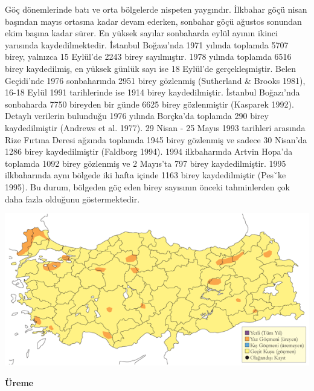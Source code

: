 \documentclass[
  letterpaper,
  DIV=11,
  numbers=noendperiod]{scrreprt}
\begin{document}
Göç dönemlerinde batı ve orta bölgelerde nispeten yaygındır. İlkbahar
göçü nisan başından mayıs ortasına kadar devam ederken, sonbahar göçü
ağustos sonundan ekim başına kadar sürer. En yüksek sayılar sonbaharda
eylül ayının ikinci yarısında kaydedilmektedir. İstanbul Boğazı'nda 1971
yılında toplamda 5707 birey, yalnızca 15 Eylül'de 2243 birey
sayılmıştır. 1978 yılında toplamda 6516 birey kaydedilmiş, en yüksek
günlük sayı ise 18 Eylül'de gerçekleşmiştir. Belen Geçidi'nde 1976
sonbaharında 2951 birey gözlenmiş (Sutherland \& Brooks 1981), 16-18
Eylül 1991 tarihlerinde ise 1914 birey kaydedilmiştir. İstanbul
Boğazı'nda sonbaharda 7750 bireyden bir günde 6625 birey gözlenmiştir
(Kasparek 1992). Detaylı verilerin bulunduğu 1976 yılında Borçka'da
toplamda 290 birey kaydedilmiştir (Andrews et al. 1977). 29 Nisan - 25
Mayıs 1993 tarihleri arasında Rize Fırtına Deresi ağzında toplamda 1945
birey gözlenmiş ve sadece 30 Nisan'da 1286 birey kaydedilmiştir
(Faldborg 1994). 1994 ilkbaharında Artvin Hopa'da toplamda 1092 birey
gözlenmiş ve 2 Mayıs'ta 797 birey kaydedilmiştir. 1995 ilkbaharında aynı
bölgede iki hafta içinde 1163 birey kaydedilmiştir (Pesˇke 1995). Bu
durum, bölgeden göç eden birey sayısının önceki tahminlerden çok daha
fazla olduğunu göstermektedir.

\includegraphics{images/harita_Page_099.png}

\textbf{Üreme}
\end{document}
